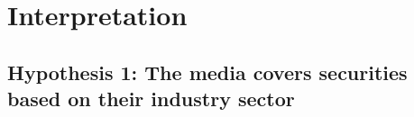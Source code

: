 \chapter{Interpretation}
\label{cha:interpretation}

\section{Hypothesis 1: The media covers securities based on their industry sector}
\label{cha:hypothesis-1}